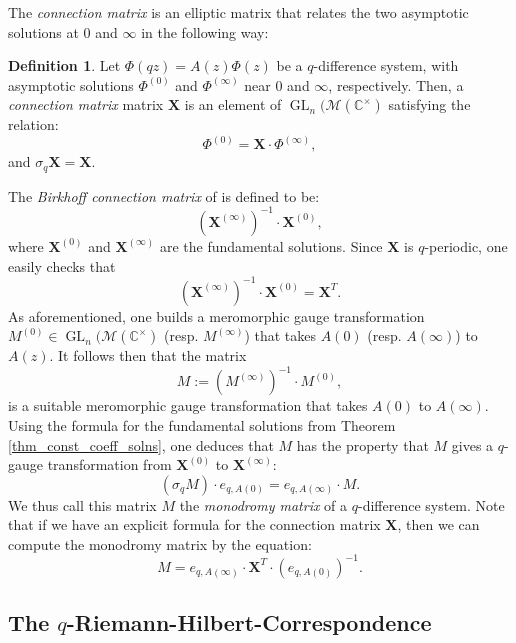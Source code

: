 \documentclass[a4paper]{report}
\theoremstyle{theorem}
\theoremstyle{definition}
\newtheorem{definition}{Definition}
\theoremstyle{remark}
\theoremstyle{proposition}
\theoremstyle{conjecture}
\theoremstyle{lemma}
\theoremstyle{corollary}
\theoremstyle{exercise}
\theoremstyle{example}
\newcommand{\C}{\mathbb{C}}
\newcommand{\mcal}{\mathcal}
\newcommand{\on}{\operatorname}
\begin{document}
  The \emph{connection matrix} is an elliptic matrix that relates the two asymptotic solutions at 
  $0$ and $\infty$ in the following way:
  
  \begin{definition}
      Let $\Phi(qz) = A(z)\Phi(z)$ be a $q$-difference system, with 
      asymptotic solutions $\Phi^{(0)}$ and $\Phi^{(\infty)}$ near 
      $0$ and $\infty$, respectively. Then, a \emph{connection matrix}
      matrix $\mathbf{X}$ is an element of $\on{GL}_n(\mcal{M}(\C^\times)$ 
      satisfying the relation:
      $$\Phi^{(0)} = \mathbf{X} \cdot \Phi^{(\infty)},$$
      and $\sigma_q \mathbf{X} = \mathbf{X}$.
  \end{definition}
  
  The \emph{Birkhoff connection matrix} of \cite{sauloy03} is defined to be: 
  $$\left(\mathbf{X}^{(\infty)}\right)^{-1}\cdot \mathbf{X}^{(0)},$$
  where $\mathbf{X}^{(0)}$ and $\mathbf{X}^{(\infty)}$ are the fundamental
  solutions. Since $\mathbf{X}$ is $q$-periodic, one easily checks that 
  $$\left(\mathbf{X}^{(\infty)}\right)^{-1}\cdot \mathbf{X}^{(0)} = \mathbf{X}^T.$$
  As aforementioned, one builds a meromorphic gauge transformation 
  $M^{(0)} \in \on{GL}_n(\mcal{M}(\C^\times)$ (resp. $M^{(\infty)}$) that takes $A(0)$ (resp. $A(\infty)$) to $A(z)$. It follows then that the matrix 
  $$M := \left(M^{(\infty)}\right)^{-1} \cdot M^{(0)},$$
  is a suitable meromorphic gauge transformation that takes $A(0)$ to $A(\infty)$. Using the formula 
  for the fundamental solutions from Theorem \ref{thm_const_coeff_solns}, one deduces that $M$ has the property 
  that $M$ gives a $q$-gauge transformation from $\mathbf{X}^{(0)}$ to $\mathbf{X}^{(\infty)}$:
  $$(\sigma_q M) \cdot  e_{q,A(0)} = e_{q,A(\infty)} \cdot M.$$
  We thus call this matrix $M$ the \emph{monodromy matrix} of a $q$-difference system. 
  Note that if we have an explicit formula for the connection matrix $\mathbf{X}$, then we can compute 
  the monodromy matrix by the equation:
  $$M = e_{q,A(\infty)} \cdot \mathbf{X}^T \cdot \left(e_{q,A(0)}\right)^{-1}.$$
  
  \subsection{The $q$-Riemann-Hilbert-Correspondence}
  
\end{document}
